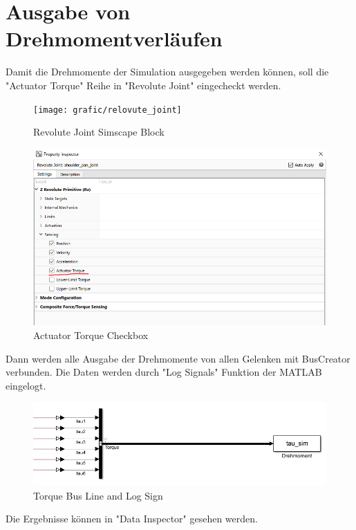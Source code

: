 \section{Ausgabe von Drehmomentverläufen}

Damit die Drehmomente der Simulation ausgegeben werden können, soll die "Actuator Torque" Reihe in "Revolute Joint" eingecheckt werden.

\begin{figure}[!htbp]
	\centering
	\texttt{[image: grafic/relovute\_joint]}
	\caption{Revolute Joint Simscape Block}
	\label{fig:simscape_revolute_joint}
\end{figure}

\begin{figure}[!htbp]
	\centering
	\includegraphics[width=0.5\linewidth]{grafic/actuator_torque}
	\caption{Actuator Torque Checkbox}
	\label{fig:simscape_relovute_joint_checkbox}
\end{figure}

Dann werden alle Ausgabe der Drehmomente von allen Gelenken mit BusCreator verbunden. Die Daten werden durch "Log Signals" Funktion der MATLAB eingelogt.

\begin{figure}[!htbp]
	\centering
	\includegraphics[width=1\linewidth]{grafic/torque_busline}
	\caption{Torque Bus Line and Log Sign}
	\label{fig:simulink_logging}
\end{figure}

Die Ergebnisse können in "Data Inspector" gesehen werden.

